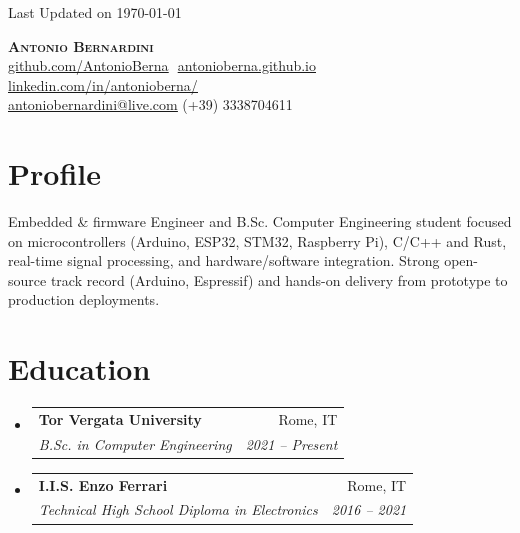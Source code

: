 \documentclass[letterpaper,11pt]{article}
\makeatletter
\newcommand{\resumeSubheading}[4]{
  \vspace{-2pt}\item
    \begin{tabular*}{0.97\textwidth}[t]{l@{\extracolsep{\fill}}r}
      \textbf{#1} & #2 \\
      \textit{\small#3} & \textit{\small #4} \\
    \end{tabular*}\vspace{-7pt}
}
\newcommand{\resumeSubHeadingListStart}{\begin{itemize}[leftmargin=0.15in, label={}]}
\newcommand{\resumeSubHeadingListEnd}{\end{itemize}}
\makeatother
\begin{document}
\begin{flushright}
  \color{gray}
  \item
  Last Updated on \today
\end{flushright}

\vspace{-5pt}

\begin{center}
    \textbf{\Huge \scshape Antonio Bernardini} \\ \vspace{8pt}
    \small
    \href{https://github.com/AntonioBerna}{\underline{github.com/AntonioBerna}} $  $
    \href{https://antonioberna.github.io}
    {\underline{antonioberna.github.io}} $  $
    \href{https://www.linkedin.com/in/antonioberna/}{\underline{linkedin.com/in/antonioberna/}} $  $ \\
    \href{mailto:antoniobernardini@live.com}
    {\underline{antoniobernardini@live.com}}
     (+39) 3338704611
\end{center}

\section{Profile}
 \begin{itemize}[leftmargin=0.15in, label={}]
    \small{\item{
      Embedded \& firmware Engineer and B.Sc. Computer Engineering student focused on microcontrollers (Arduino, ESP32, STM32, Raspberry Pi), C/C++ and Rust, real-time signal processing, and hardware/software integration. Strong open-source track record (Arduino, Espressif) and hands-on delivery from prototype to production deployments.
    }}
 \end{itemize}
\vspace{-10pt}

\section{Education}
  \resumeSubHeadingListStart
    \resumeSubheading
      {Tor Vergata University}{Rome, IT}
      {B.Sc. in Computer Engineering}{2021 -- Present}
    \resumeSubheading
      {I.I.S. Enzo Ferrari}{Rome, IT}
      {Technical High School Diploma in Electronics}{2016 -- 2021}      
  \resumeSubHeadingListEnd
\end{document}
